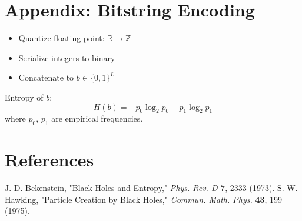 \documentclass[11pt]{article}
\begin{document}
\appendix
\section{Appendix: Bitstring Encoding}

\begin{itemize}
  \item Quantize floating point: $\mathbb{R} \to \mathbb{Z}$
  \item Serialize integers to binary
  \item Concatenate to $b \in \{0,1\}^L$
\end{itemize}

Entropy of $b$:
\[
  H(b) = -p_0 \log_2 p_0 - p_1 \log_2 p_1
\]
where $p_0$, $p_1$ are empirical frequencies.

\section*{References}
\begin{thebibliography}{9}
   J. D. Bekenstein, "Black Holes and Entropy," \textit{Phys. Rev. D} \textbf{7}, 2333 (1973).
   S. W. Hawking, "Particle Creation by Black Holes," \textit{Commun. Math. Phys.} \textbf{43}, 199 (1975).
\end{thebibliography}
\end{document}
